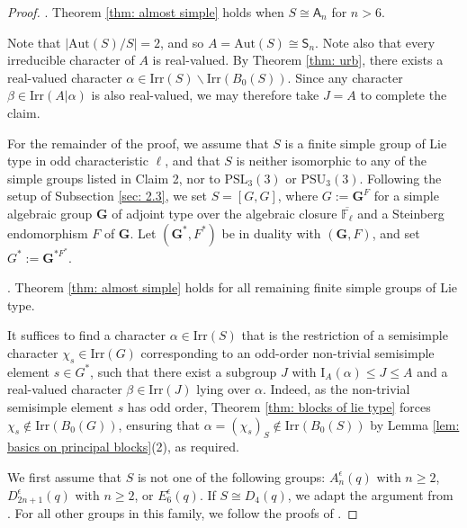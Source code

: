 \documentclass[10pt]{article}
\begin{document}
\begin{proof}
  


 . Theorem \ref{thm: almost simple} holds when $S\cong \mathsf{A}_n$ for $n>6$.

Note that $|\mathrm{Aut}(S)/S| = 2$, and so $A = \mathrm{Aut}(S) \cong \mathsf{S}_n$.
Note also that every irreducible character of $A$ is real-valued.
By Theorem \ref{thm: urb}, there exists a real-valued character $\alpha \in \mathrm{Irr}(S) \smallsetminus \mathrm{Irr}(B_0(S))$.
Since any character $\beta\in \mathrm{Irr}(A|\alpha)$ is also real-valued,
 we may therefore take $J=A$ to complete the claim.



\medskip

For the remainder of the proof, we assume that $S$ is a finite simple group of Lie type in odd characteristic $\ell$,
and that 
$S$ is neither isomorphic to any of the simple groups listed in Claim 2, nor to $\mathrm{PSL}_{3}(3)$ or $\mathrm{PSU}_{3}(3)$.
Following the setup of Subsection \ref{sec: 2.3},
we set $S = [G, G]$, where $G := \mathbf{G}^F$ for a simple algebraic group $\mathbf{G}$ of adjoint type over the algebraic closure $\overline{\mathbb{F}_\ell}$ and a Steinberg endomorphism $F$ of $\mathbf{G}$.
Let $(\mathbf{G}^{*}, F^{*})$ be in duality with $(\mathbf{G}, F)$, and set $G^*:=\mathbf{G}^{*F^*}$.

    


. Theorem \ref{thm: almost simple} holds
for all remaining finite simple groups of Lie type.

It suffices to find a character $\alpha\in \mathrm{Irr}(S)$
that is the restriction of a semisimple character $\chi_s\in \mathrm{Irr}(G)$ corresponding to an odd-order non-trivial semisimple element $s\in G^*$,
such that there exist a subgroup $J$ with $\mathrm{I}_{A}(\alpha)\leq J\leq A$ and a real-valued character $\beta\in \mathrm{Irr}(J)$ lying over $\alpha$.
Indeed, as the non-trivial semisimple element $s$ has odd order, 
Theorem \ref{thm: blocks of lie type} forces $\chi_s\notin \mathrm{Irr}(B_0(G))$,
ensuring that $\alpha=(\chi_s)_S\notin \mathrm{Irr}(B_0(S))$ by Lemma \ref{lem: basics on principal blocks}(2),
as required.




We first assume that $S$ is not one of the following groups: $A_n^\epsilon(q) $ with $ n\geq 2$, $D_{2n+1}^\epsilon(q)$ with $n\geq 2$, or $E_6^{\epsilon}(q)$.
If $S\cong D_4(q)$, we adapt the argument from \cite[Proposition 4.9]{marinelli13}.
For all other groups in this family, we follow the proofs of \cite[Propositions 4.4,~4.5]{marinelli13}.


\end{proof}
\end{document}
